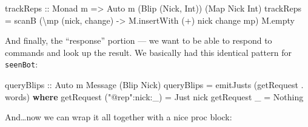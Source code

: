 \documentclass[]{article}
\newenvironment{Shaded}{}{}
\newcommand{\KeywordTok}[1]{\textcolor[rgb]{0.00,0.44,0.13}{\textbf{#1}}}
\newcommand{\DataTypeTok}[1]{\textcolor[rgb]{0.56,0.13,0.00}{#1}}
\newcommand{\StringTok}[1]{\textcolor[rgb]{0.25,0.44,0.63}{#1}}
\newcommand{\OtherTok}[1]{\textcolor[rgb]{0.00,0.44,0.13}{#1}}
\newcommand{\FunctionTok}[1]{\textcolor[rgb]{0.02,0.16,0.49}{#1}}
\newcommand{\NormalTok}[1]{#1}
\begin{document}
\begin{Shaded}
\begin{Highlighting}[]
\OtherTok{trackReps ::} \DataTypeTok{Monad}\NormalTok{ m }\OtherTok{=>} \DataTypeTok{Auto}\NormalTok{ m (}\DataTypeTok{Blip}\NormalTok{ (}\DataTypeTok{Nick}\NormalTok{, }\DataTypeTok{Int}\NormalTok{)) (}\DataTypeTok{Map} \DataTypeTok{Nick} \DataTypeTok{Int}\NormalTok{)}
\NormalTok{trackReps }\FunctionTok{=}\NormalTok{ scanB (\textbackslash{}mp (nick, change) }\OtherTok{->}\NormalTok{ M.insertWith (}\FunctionTok{+}\NormalTok{) nick change mp) M.empty}
\end{Highlighting}
\end{Shaded}

And finally, the ``response'' portion --- we want to be able to respond to
commands and look up the result. We basically had this identical pattern for
\texttt{seenBot}:

\begin{Shaded}
\begin{Highlighting}[]
\OtherTok{queryBlips ::} \DataTypeTok{Auto}\NormalTok{ m }\DataTypeTok{Message}\NormalTok{ (}\DataTypeTok{Blip} \DataTypeTok{Nick}\NormalTok{)}
\NormalTok{queryBlips }\FunctionTok{=}\NormalTok{ emitJusts (getRequest }\FunctionTok{.}\NormalTok{ words)}
  \KeywordTok{where}
\NormalTok{    getRequest (}\StringTok{"@rep"}\FunctionTok{:}\NormalTok{nick}\FunctionTok{:}\NormalTok{_) }\FunctionTok{=} \DataTypeTok{Just}\NormalTok{ nick}
\NormalTok{    getRequest _                }\FunctionTok{=} \DataTypeTok{Nothing}
\end{Highlighting}
\end{Shaded}

And\ldots{}now we can wrap it all together with a nice proc block:
\end{document}
